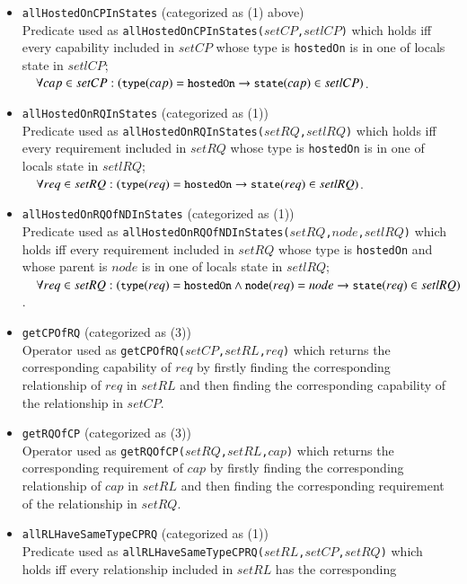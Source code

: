 \documentclass[12pt]{report}
\newcommand{\ra}{\rightarrow}
\newcommand{\mbstt}[1]{\mbox{\small{\tt {#1}}}}
\newcommand{\stt}[1]{{\small{\tt {#1}}}}
\begin{document}
\begin{itemize}
\item \stt{allHostedOnCPInStates} (categorized as (1) above)\\ 
  Predicate used as \stt{allHostedOnCPInStates($setCP$,$setlCP$)}
  which holds iff every capability included in $setCP$ whose type is
  {\tt hostedOn} is in one of locals state in $setlCP$;\\$~~~~\forall
  cap\in
  setCP:(\mbstt{type}(cap)=\mbstt{hostedOn}\ra\mbstt{state}(cap)\in
  setlCP)$.
\item \stt{allHostedOnRQInStates} (categorized as (1))\\ 
  Predicate used as \stt{allHostedOnRQInStates($setRQ$,$setlRQ$)}
  which holds iff every requirement included in $setRQ$ whose type is
  {\tt hostedOn} is in one of locals state in $setlRQ$;\\$~~~~\forall
  req\in
  setRQ:(\mbstt{type}(req)=\mbstt{hostedOn}\ra\mbstt{state}(req)\in
  setlRQ)$.
\item \stt{allHostedOnRQOfNDInStates} (categorized as (1))\\ 
  Predicate used as
  \stt{allHostedOnRQOfNDInStates($setRQ$,$node$,$setlRQ$)} which holds iff
  every requirement included in $setRQ$ whose type is {\tt hostedOn} and whose
  parent is $node$ is in one of locals state in $setlRQ$;\\$~~~~\forall
  req\in
  setRQ:(\mbstt{type}(req)=\mbstt{hostedOn}\land\mbstt{node}(req)=node\ra\mbstt{state}(req)\in
  setlRQ)$.
\item \stt{getCPOfRQ} (categorized as (3))\\
 Operator used as \stt{getCPOfRQ($setCP$,$setRL$,$req$)} which returns
 the corresponding capability of $req$ by firstly finding the
 corresponding relationship of $req$ in $setRL$ and then finding the
 corresponding capability of the relationship in $setCP$.
\item \stt{getRQOfCP} (categorized as (3))\\
 Operator used as \stt{getRQOfCP($setRQ$,$setRL$,$cap$)} which returns
 the corresponding requirement of $cap$ by firstly finding the
 corresponding relationship of $cap$ in $setRL$ and then finding the
 corresponding requirement of the relationship in $setRQ$.
\item \stt{allRLHaveSameTypeCPRQ} (categorized as (1))\\ 
  Predicate used as
  \stt{allRLHaveSameTypeCPRQ($setRL$,$setCP$,$setRQ$)} which holds iff
  every relationship included in $setRL$ has the corresponding

\end{itemize}
\end{document}
